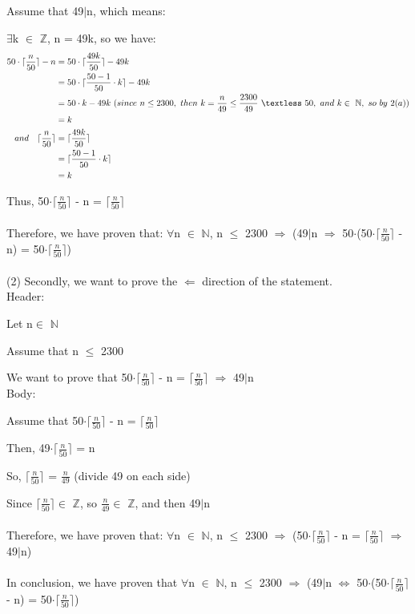 \documentclass[12pt]{article}
\begin{document}
Assume that 49$\mid$n, which means:

$\exists$k $\in$ $\mathbb{Z}$, n = 49k, so we have:\\
\begin{align*}
50\cdot \lceil \frac{n}{50} \rceil - n &= 50\cdot \lceil \frac{49k}{50} \rceil - 49k \\
&= 50\cdot \lceil \frac{50 - 1}{50} \cdot k\rceil - 49k \\
&= 50\cdot k - 49k \ (since\ n \leq 2300, \ then\  k = \frac{n}{49} \leq \frac{2300}{49} \ \textless \ 50, \ and \ k\in \  \mathbb{N}, \ so\ by\ 2(a)) \\
&= k \\
and\quad \lceil \frac{n}{50} \rceil &= \lceil \frac{49k}{50} \rceil \\
&= \lceil \frac{50 - 1}{50} \cdot k\rceil \\
&= k
\end{align*}

Thus, 50$\cdot$$\lceil$$\frac{n}{50}$$\rceil$ - n = $\lceil$$\frac{n}{50}$$\rceil$ \\
~\\
Therefore, we have proven that: $\forall$n $\in$ $\mathbb{N}$, n $\leq$ 2300 $\Rightarrow$ (49$\mid$n $\Rightarrow$  50$\cdot$(50$\cdot$$\lceil$$\frac{n}{50}$$\rceil$ - n) = 50$\cdot$$\lceil$$\frac{n}{50}$$\rceil$) \\
~\\
(2) Secondly, we want to prove the $\Leftarrow$ direction of the statement. \\
Header: 

Let n$\in$ $\mathbb{N}$

Assume that n $\leq$ 2300

We want to prove that 50$\cdot$$\lceil$$\frac{n}{50}$$\rceil$ - n = $\lceil$$\frac{n}{50}$$\rceil$ $\Rightarrow$ 49$\mid$n \\
Body:

Assume that 50$\cdot$$\lceil$$\frac{n}{50}$$\rceil$ - n = $\lceil$$\frac{n}{50}$$\rceil$

Then, 49$\cdot$$\lceil$$\frac{n}{50}$$\rceil$ = n

So, $\lceil$$\frac{n}{50}$$\rceil$ = $\frac{n}{49}$ (divide 49 on each side)

Since $\lceil$$\frac{n}{50}$$\rceil$$\in$ $\mathbb{Z}$, so $\frac{n}{49}$$\in$ $\mathbb{Z}$, and then 49$\mid$n \\ 
~\\
Therefore, we have proven that: $\forall$n $\in$ $\mathbb{N}$, n $\leq$ 2300 $\Rightarrow$ (50$\cdot$$\lceil$$\frac{n}{50}$$\rceil$ - n = $\lceil$$\frac{n}{50}$$\rceil$ $\Rightarrow$ 49$\mid$n) \\
~\\
In conclusion, we have proven that $\forall$n $\in$ $\mathbb{N}$, n $\leq$ 2300 $\Rightarrow$ (49$\mid$n $\Leftrightarrow$  50$\cdot$(50$\cdot$$\lceil$$\frac{n}{50}$$\rceil$ - n) = 50$\cdot$$\lceil$$\frac{n}{50}$$\rceil$) \\
\end{document}

